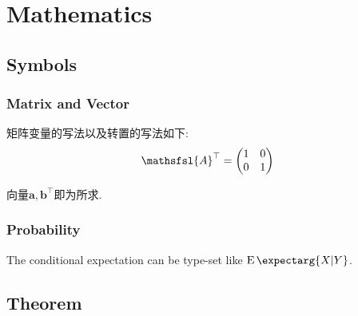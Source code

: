 \documentclass[a4paper, 12pt]{ctexart}
\title{\TITLE}
\author{\AUTHOR}
\date{\today}
\theoremstyle{plain}
\theoremstyle{plain}
\theoremstyle{plain}
\theoremstyle{nonumberplain}
\newcommand{\expect}{\operatorname{E}\expectarg}
\newcommand{\matr}[1]{\ensuremath{\mathsfsl{#1}}} %
\newcommand{\vect}[1]{\bm{#1}}
\begin{document}

    \maketitle
    \thispagestyle{empty}



    \newpage
    \tableofcontents


    \newpage
    \pagestyle{fancy}
    \linenumbers

    \section{Mathematics}

    \subsection{Symbols}

    \subsubsection{Matrix and Vector}

    矩阵变量的写法以及转置的写法如下:
    \begin{equation}
        \matr{A}^{\top} =
        \begin{pmatrix}
            1 & 0\\
            0 & 1
        \end{pmatrix}
    \end{equation}

    向量$\vect{a}, \vect{b}^{\top}$即为所求.

    \subsubsection{Probability}

    The conditional expectation can be type-set like $\expect{X|Y}$.

    \subsection{Theorem}
\end{document}
